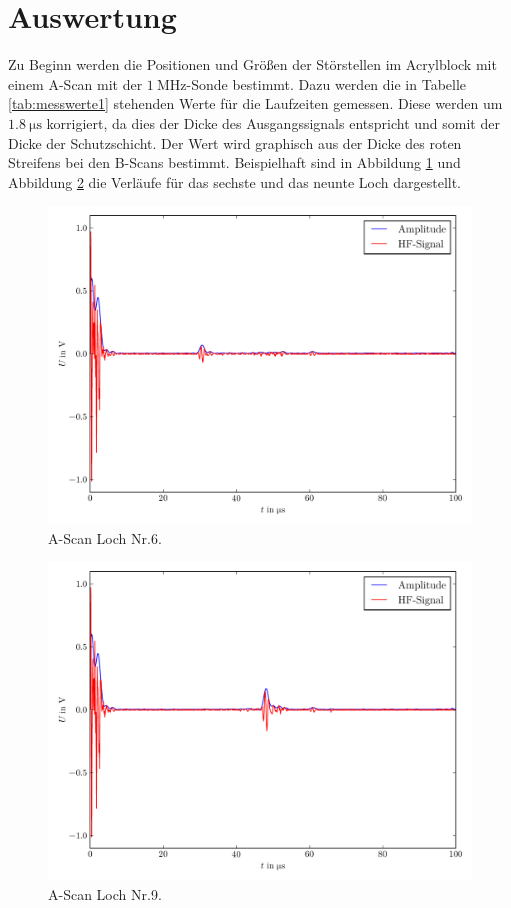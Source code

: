 \documentclass[
  bibliography=totoc,     %
  captions=tableheading,  %
  titlepage=firstiscover, %
]{scrartcl}
\begin{document}
\section{Auswertung}
\label{sec:auswertung}
Zu Beginn werden die Positionen und Größen der Störstellen im Acrylblock
mit einem A-Scan mit der $\SI{1}{\mega\hertz}$-Sonde bestimmt.
Dazu werden die in Tabelle \ref{tab:messwerte1} stehenden Werte für
die Laufzeiten gemessen. Diese werden um $\SI{1.8}{\micro\second}$ korrigiert,
da dies der Dicke des Ausgangssignals entspricht und somit der Dicke der
Schutzschicht. Der Wert wird graphisch aus der Dicke des roten Streifens bei
den B-Scans bestimmt. Beispielhaft sind in Abbildung \ref{fig:plot1} und
Abbildung \ref{fig:plot2} die Verläufe für das sechste und das neunte Loch
dargestellt.
\begin{figure}[H]
  \centering
  \includegraphics[width=\textwidth]{Plot.pdf}
  \caption{A-Scan Loch Nr.6.}
  \label{fig:plot1}
\end{figure}
\begin{figure}[H]
  \centering
  \includegraphics[width=\textwidth]{Plot2.pdf}
  \caption{A-Scan Loch Nr.9.}
  \label{fig:plot2}
\end{figure}
\end{document}
